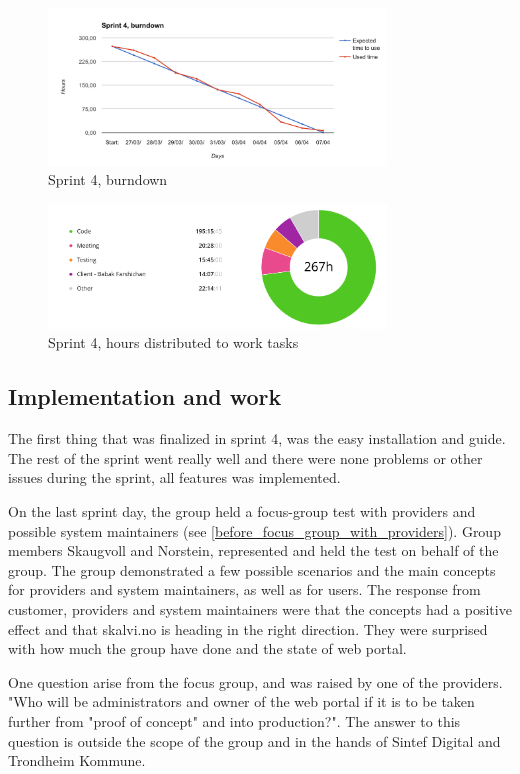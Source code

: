 \begin{figure}[ht]
\centering
    \includegraphics[width=0.8\textwidth]{fig/sprint4}
\caption{Sprint 4, burndown}
\end{figure}

\begin{figure}[ht]
\centering
    \includegraphics[width=0.8\textwidth]{fig/sprint4-diagram}
\caption{Sprint 4, hours distributed to work tasks}
\end{figure}

\subsection {Implementation and work}
The first thing that was finalized in sprint 4, was the easy installation and guide. The rest of the sprint went really well and there were none problems or other issues during the sprint, all features was implemented.

On the last sprint day, the group held a focus-group test with providers and possible system maintainers (see \ref{before_focus_group_with_providers}). Group members Skaugvoll and Norstein, represented and held the test on behalf of the group. The group demonstrated a few possible scenarios and the main concepts for providers and system maintainers, as well as for users. 
The response from customer, providers and system maintainers were that the concepts had a positive effect and that skalvi.no is heading in the right direction. They were surprised with how much the group have done and the state of web portal.

One question arise from the focus group, and was raised by one of  the providers. "Who will be administrators and owner of the web portal if it is to be taken further from "proof of concept" and into production?". The answer to this question is outside the scope of the group and in the hands of Sintef Digital and Trondheim Kommune.

